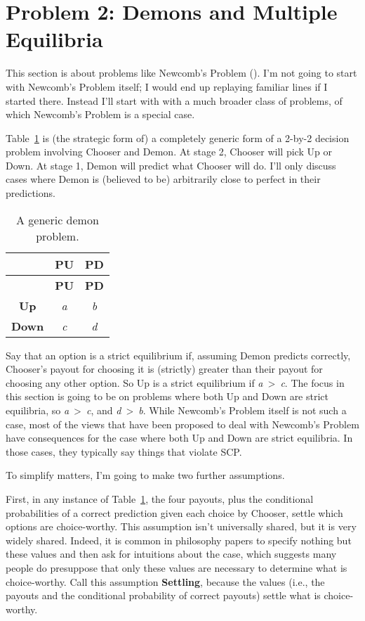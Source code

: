 \documentclass[
  11pt,
  letterpaper,
  DIV=11,
  numbers=noendperiod,
  twoside]{scrartcl}
\begin{document}
\section{Problem 2: Demons and Multiple Equilibria}\label{sec-multiple}

This section is about problems like Newcomb's Problem
(). I'm not going to start with
Newcomb's Problem itself; I would end up replaying familiar lines if I
started there. Instead I'll start with with a much broader class of
problems, of which Newcomb's Problem is a special case.

Table~\ref{tbl-generic-demon} is (the strategic form of) a completely
generic form of a 2-by-2 decision problem involving Chooser and Demon.
At stage 2, Chooser will pick Up or Down. At stage 1, Demon will predict
what Chooser will do. I'll only discuss cases where Demon is (believed
to be) arbitrarily close to perfect in their predictions.

\begin{longtable}[]{@{}ccc@{}}
\caption{A generic demon
problem.}\label{tbl-generic-demon}\tabularnewline
\toprule\noalign{}
& \textbf{PU} & \textbf{PD} \\
\midrule\noalign{}
\endfirsthead
\toprule\noalign{}
& \textbf{PU} & \textbf{PD} \\
\midrule\noalign{}
\endhead
\bottomrule\noalign{}
\endlastfoot
\textbf{Up} & \emph{a} & \emph{b} \\
\textbf{Down} & \emph{c} & \emph{d} \\
\end{longtable}

Say that an option is a strict equilibrium if, assuming Demon predicts
correctly, Chooser's payout for choosing it is (strictly) greater than
their payout for choosing any other option. So Up is a strict
equilibrium if \emph{a}~\textgreater~\emph{c}. The focus in this section
is going to be on problems where both Up and Down are strict equilibria,
so \emph{a}~\textgreater~\emph{c}, and \emph{d}~\textgreater~\emph{b}.
While Newcomb's Problem itself is not such a case, most of the views
that have been proposed to deal with Newcomb's Problem have consequences
for the case where both Up and Down are strict equilibria. In those
cases, they typically say things that violate SCP.

To simplify matters, I'm going to make two further assumptions.

First, in any instance of Table~\ref{tbl-generic-demon}, the four
payouts, plus the conditional probabilities of a correct prediction
given each choice by Chooser, settle which options are choice-worthy.
This assumption isn't universally shared, but it is very widely shared.
Indeed, it is common in philosophy papers to specify nothing but these
values and then ask for intuitions about the case, which suggests many
people do presuppose that only these values are necessary to determine
what is choice-worthy. Call this assumption \textbf{Settling}, because
the values (i.e., the payouts and the conditional probability of correct
payouts) settle what is choice-worthy.
\end{document}
